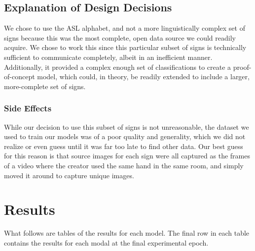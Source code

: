 \documentclass[10pt,Times New Roman]{article}
\begin{document}
    \subsection{Explanation of Design Decisions}
        We chose to use the ASL alphabet, and not a more linguistically complex set of signs
        because this was the most complete, open data source we could readily acquire. We 
        chose to work this since this particular subset of signs is technically sufficient
        to communicate completely, albeit in an inefficient manner. Additionally, it provided
        a complex enough set of classifications to create a proof-of-concept model, which
        could, in theory, be readily extended to include a larger, more-complete set of signs.

        \subsubsection{Side Effects}\label{sec:sideeffects}
            While our decision to use this subset of signs is not unreasonable, the dataset
            we used to train our models was of a poor quality and generality, which we did
            not realize or even guess until it was far too late to find other data. Our best
            guess for this reason is that source images for each sign were all captured as
            the frames of a video where the creator used the same hand in the same room, and
            simply moved it around to capture unique images.

\section{Results}
    What follows are tables of the results for each model. The final row in each table contains
    the results for each modal at the final experimental epoch.
\end{document}
